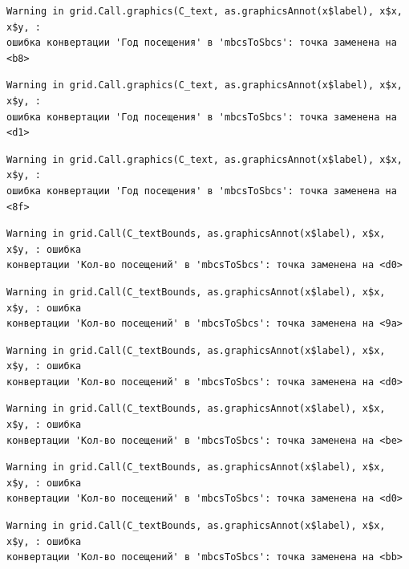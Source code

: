 \documentclass[
  letterpaper,
  DIV=11,
  numbers=noendperiod]{scrreprt}
\begin{document}
\begin{verbatim}
Warning in grid.Call.graphics(C_text, as.graphicsAnnot(x$label), x$x, x$y, :
ошибка конвертации 'Год посещения' в 'mbcsToSbcs': точка заменена на <b8>
\end{verbatim}

\begin{verbatim}
Warning in grid.Call.graphics(C_text, as.graphicsAnnot(x$label), x$x, x$y, :
ошибка конвертации 'Год посещения' в 'mbcsToSbcs': точка заменена на <d1>
\end{verbatim}

\begin{verbatim}
Warning in grid.Call.graphics(C_text, as.graphicsAnnot(x$label), x$x, x$y, :
ошибка конвертации 'Год посещения' в 'mbcsToSbcs': точка заменена на <8f>
\end{verbatim}

\begin{verbatim}
Warning in grid.Call(C_textBounds, as.graphicsAnnot(x$label), x$x, x$y, : ошибка
конвертации 'Кол-во посещений' в 'mbcsToSbcs': точка заменена на <d0>
\end{verbatim}

\begin{verbatim}
Warning in grid.Call(C_textBounds, as.graphicsAnnot(x$label), x$x, x$y, : ошибка
конвертации 'Кол-во посещений' в 'mbcsToSbcs': точка заменена на <9a>
\end{verbatim}

\begin{verbatim}
Warning in grid.Call(C_textBounds, as.graphicsAnnot(x$label), x$x, x$y, : ошибка
конвертации 'Кол-во посещений' в 'mbcsToSbcs': точка заменена на <d0>
\end{verbatim}

\begin{verbatim}
Warning in grid.Call(C_textBounds, as.graphicsAnnot(x$label), x$x, x$y, : ошибка
конвертации 'Кол-во посещений' в 'mbcsToSbcs': точка заменена на <be>
\end{verbatim}

\begin{verbatim}
Warning in grid.Call(C_textBounds, as.graphicsAnnot(x$label), x$x, x$y, : ошибка
конвертации 'Кол-во посещений' в 'mbcsToSbcs': точка заменена на <d0>
\end{verbatim}

\begin{verbatim}
Warning in grid.Call(C_textBounds, as.graphicsAnnot(x$label), x$x, x$y, : ошибка
конвертации 'Кол-во посещений' в 'mbcsToSbcs': точка заменена на <bb>
\end{verbatim}
\end{document}
